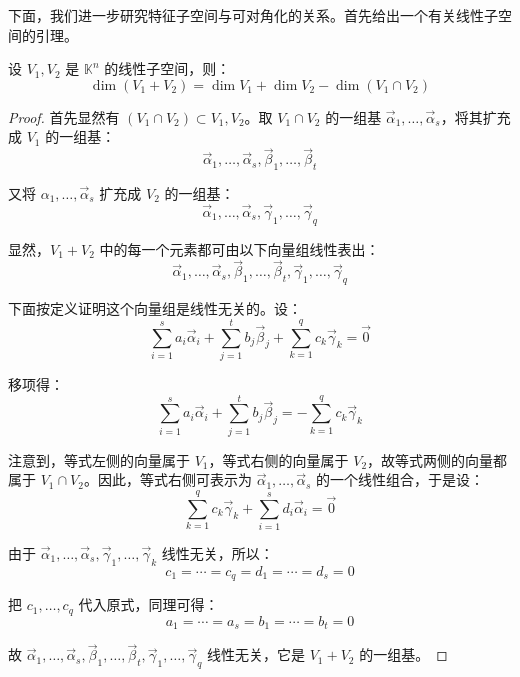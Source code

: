 下面，我们进一步研究特征子空间与可对角化的关系。首先给出一个有关线性子空间的引理。

\begin{theorem}
	设 $V_1, V_2$ 是 $\mathbb K^n$ 的线性子空间，则：
	$$
	\dim(V_1 + V_2) = \dim V_1 + \dim V_2 - \dim (V_1 \cap V_2)
	$$
\end{theorem}

\begin{proof}
	首先显然有 $(V_1 \cap V_2) \subset V_1, V_2$。取 $V_1 \cap V_2$ 的一组基 $\vec \alpha_1, \ldots, \vec \alpha_s$，将其扩充成 $V_1$ 的一组基：
	$$
	\vec \alpha_1, \ldots, \vec \alpha_s, \vec \beta_1, \ldots, \vec \beta_t
	$$

	又将 $\alpha_1, \ldots, \vec \alpha_s$ 扩充成 $V_2$ 的一组基：
	$$
	\vec \alpha_1, \ldots, \vec \alpha_s, \vec \gamma_1, \ldots, \vec \gamma_q
	$$

	显然，$V_1 + V_2$ 中的每一个元素都可由以下向量组线性表出：
	$$
	\vec \alpha_1, \ldots, \vec \alpha_s, \vec \beta_1, \ldots, \vec \beta_t, \vec \gamma_1, \ldots, \vec \gamma_q
	$$

	下面按定义证明这个向量组是线性无关的。设：
	$$
	\sum\limits_{i = 1}^s a_i \vec \alpha_i + \sum\limits_{j = 1}^t b_j \vec \beta_j + \sum\limits_{k = 1}^q c_k \vec \gamma_k = \vec 0
	$$

	移项得：
	$$
	\sum\limits_{i = 1}^s a_i \vec \alpha_i + \sum\limits_{j = 1}^t b_j \vec \beta_j = - \sum\limits_{k = 1}^q c_k \vec \gamma_k
	$$

	注意到，等式左侧的向量属于 $V_1$，等式右侧的向量属于 $V_2$，故等式两侧的向量都属于 $V_1 \cap V_2$。因此，等式右侧可表示为 $\vec \alpha_1, \ldots, \vec \alpha_s$ 的一个线性组合，于是设：
	$$
	\sum\limits_{k = 1}^q c_k \vec \gamma_k + \sum\limits_{i = 1}^s d_i \vec \alpha_i = \vec 0
	$$

	由于 $\vec \alpha_1, \ldots, \vec \alpha_s, \vec \gamma_1, \ldots, \vec \gamma_k$ 线性无关，所以：
	$$
	c_1 = \cdots = c_q = d_1 = \cdots = d_s = 0
	$$

	把 $c_1, \ldots, c_q$ 代入原式，同理可得：
	$$
	a_1 = \cdots = a_s = b_1 = \cdots = b_t = 0
	$$

	故 $\vec \alpha_1, \ldots, \vec \alpha_s, \vec \beta_1, \ldots, \vec \beta_t, \vec \gamma_1, \ldots, \vec \gamma_q$ 线性无关，它是 $V_1 + V_2$ 的一组基。
\end{proof}